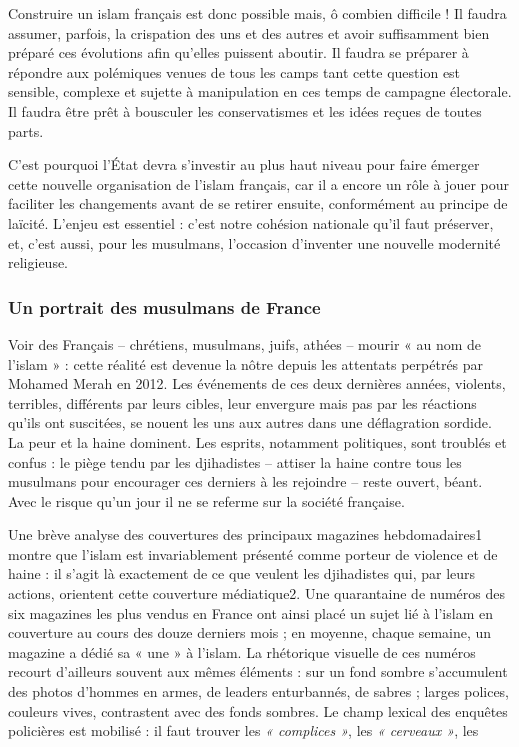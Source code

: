 Construire un islam français est donc possible mais, ô combien difficile
! Il faudra assumer, parfois, la crispation des uns et des autres et
avoir suffisamment bien préparé ces évolutions afin qu'elles puissent
aboutir. Il faudra se préparer à répondre
aux polémiques venues de tous les camps tant cette question est
sensible, complexe et sujette à manipulation en ces temps de campagne
électorale. Il faudra être prêt à bousculer les conservatismes et les
idées reçues de toutes parts.

C'est pourquoi l'État devra s'investir au plus haut niveau pour faire
émerger cette nouvelle organisation de l'islam français, car il a encore
un rôle à jouer pour faciliter les changements avant de se retirer
ensuite, conformément au principe de laïcité. L'enjeu est essentiel :
c'est notre cohésion nationale qu'il faut préserver, et, c'est aussi,
pour les musulmans, l'occasion d'inventer une nouvelle modernité
religieuse.


\subsubsection{Un portrait des musulmans de France}

Voir des Français -- chrétiens, musulmans, juifs, athées -- mourir « au
nom de l'islam » : cette réalité est devenue la nôtre depuis les
attentats perpétrés par Mohamed Merah en 2012. Les événements de ces
deux dernières années, violents, terribles, différents par leurs cibles,
leur envergure mais pas par les réactions qu'ils ont suscitées, se
nouent les uns aux autres dans une déflagration sordide. La peur et la
haine dominent. Les esprits, notamment politiques, sont troublés et
confus : le piège tendu par les djihadistes -- attiser la haine contre
tous les musulmans pour encourager ces derniers à les rejoindre -- reste
ouvert, béant. Avec le risque qu'un jour il ne se referme sur la société
française.

Une brève analyse des couvertures des principaux magazines
hebdomadaires1 montre que l'islam est invariablement présenté comme
porteur de violence et de haine : il s'agit là exactement de ce que
veulent les djihadistes qui, par leurs actions, orientent cette
couverture médiatique2. Une quarantaine de numéros des six magazines les
plus vendus en France ont ainsi placé un sujet lié à l'islam en
couverture au cours des douze derniers mois ; en moyenne, chaque
semaine, un magazine a dédié sa « une » à l'islam. La rhétorique
visuelle de ces numéros recourt d'ailleurs souvent aux mêmes éléments :
sur un fond sombre s'accumulent des photos d'hommes en armes, de leaders
enturbannés, de sabres ; larges polices, couleurs vives, contrastent
avec des fonds sombres. Le champ lexical des enquêtes policières est
mobilisé : il faut trouver les \emph{« complices »}, les \emph{«
cerveaux »}, les

